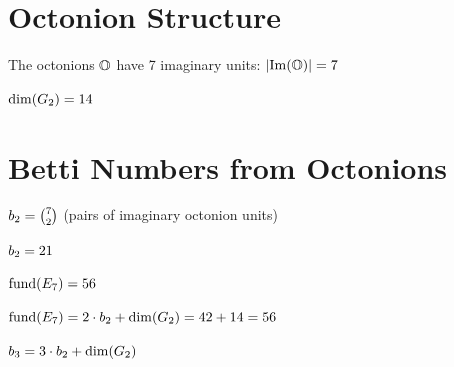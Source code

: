 \section{Octonion Structure}

\begin{definition}\label{def:imaginary_count}
    \leanok
    The octonions $\mathbb{O}$ have 7 imaginary units: $|\mathrm{Im}(\mathbb{O})| = 7$
\end{definition}

\begin{definition}[G2 Dimension]\label{def:dim_G2}
    \leanok
    $\mathrm{dim}(G_2) = 14$
\end{definition}

\section{Betti Numbers from Octonions}

\begin{definition}\label{def:b2}
    \leanok
    $b_2 = \binom{7}{2}$ (pairs of imaginary octonion units)
\end{definition}

\begin{theorem}[b2 Value]\label{thm:b2_eq}
    \leanok
    $b_2 = 21$
\end{theorem}

\begin{definition}[E7 Fundamental]\label{def:fund_E7}
    \leanok
    $\mathrm{fund}(E_7) = 56$
\end{definition}

\begin{theorem}[E7 Decomposition]\label{thm:fund_E7_decomposition}
    \leanok
    $\mathrm{fund}(E_7) = 2 \cdot b_2 + \mathrm{dim}(G_2) = 42 + 14 = 56$
\end{theorem}

\begin{definition}\label{def:b3}
    \leanok
    $b_3 = 3 \cdot b_2 + \mathrm{dim}(G_2)$
\end{definition}

